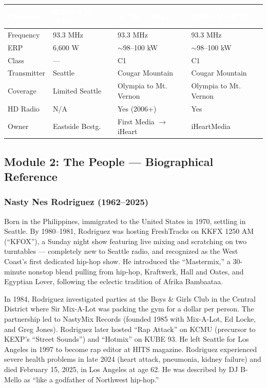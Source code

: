 \documentclass[11pt,letterpaper]{article}
\newcommand{\tableheader}[1]{\textbf{\sffamily\textcolor{white}{#1}}}
\begin{document}
\begin{center}
\begin{tabularx}{\textwidth}{L{3cm}XXX}
\toprule
{}
\tableheader{Parameter} & \tableheader{KBLE-FM (1964)} & \tableheader{KUBE (1982+)} & \tableheader{KJR-FM (2022+)} \\
\midrule
Frequency & 93.3 MHz & 93.3 MHz & 93.3 MHz \\
ERP & 6,600 W & $\sim$98--100 kW & $\sim$98--100 kW \\
Class & --- & C1 & C1 \\
Transmitter & Seattle & Cougar Mountain & Cougar Mountain \\
Coverage & Limited Seattle & Olympia to Mt. Vernon & Olympia to Mt. Vernon \\
HD Radio & N/A & Yes (2006+) & Yes \\
Owner & Eastside Bcstg. & First Media $\rightarrow$ iHeart & iHeartMedia \\
\bottomrule
\end{tabularx}
\end{center}

\subsection{Module 2: The People --- Biographical Reference}

\subsubsection{Nasty Nes Rodriguez (1962--2025)}
Born in the Philippines, immigrated to the United States in 1970, settling in Seattle. By 1980--1981, Rodriguez was hosting FreshTracks on KKFX 1250 AM (``KFOX''), a Sunday night show featuring live mixing and scratching on two turntables --- completely new to Seattle radio, and recognized as the West Coast's first dedicated hip-hop show. He introduced the ``Mastermix,'' a 30-minute nonstop blend pulling from hip-hop, Kraftwerk, Hall and Oates, and Egyptian Lover, following the eclectic tradition of Afrika Bambaataa.

In 1984, Rodriguez investigated parties at the Boys \& Girls Club in the Central District where Sir Mix-A-Lot was packing the gym for a dollar per person. The partnership led to NastyMix Records (founded 1985 with Mix-A-Lot, Ed Locke, and Greg Jones). Rodriguez later hosted ``Rap Attack'' on KCMU (precursor to KEXP's ``Street Sounds'') and ``Hotmix'' on KUBE 93. He left Seattle for Los Angeles in 1997 to become rap editor at HITS magazine. Rodriguez experienced severe health problems in late 2024 (heart attack, pneumonia, kidney failure) and died February 15, 2025, in Los Angeles at age 62. He was described by DJ B-Mello as ``like a godfather of Northwest hip-hop.''
\end{document}
